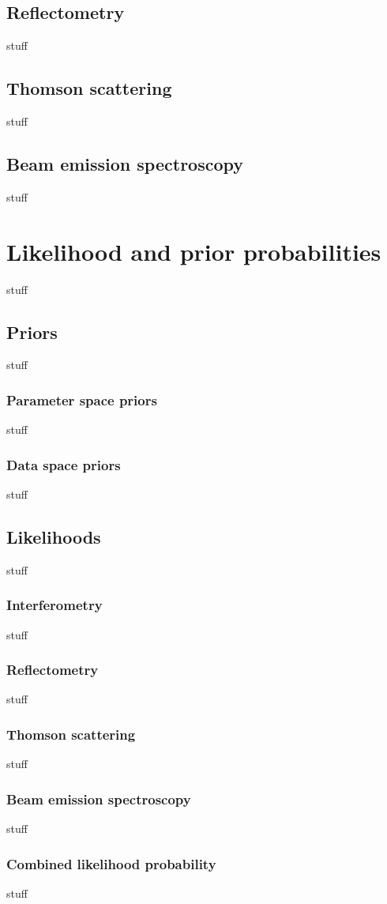 \documentclass[12pt]{article}
\numberwithin{equation}{section}
\begin{document}
\subsection{Reflectometry}
stuff
\subsection{Thomson scattering}
stuff
\subsection{Beam emission spectroscopy}
stuff
\section{Likelihood and prior probabilities}
stuff
\subsection{Priors}
stuff
\subsubsection{Parameter space priors}
stuff
\subsubsection{Data space priors}
stuff
\subsection{Likelihoods}
stuff
\subsubsection{Interferometry}
stuff
\subsubsection{Reflectometry}
stuff
\subsubsection{Thomson scattering}
stuff
\subsubsection{Beam emission spectroscopy}
stuff
\subsubsection{Combined likelihood probability}
stuff
\end{document}
